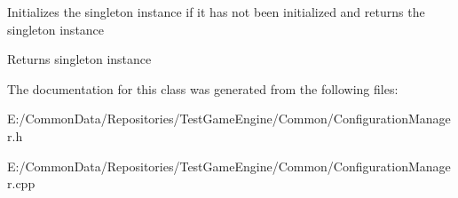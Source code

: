 Initializes the singleton instance if it has not been initialized and returns the singleton instance \begin{DoxyReturn}{Returns}
singleton instance 
\end{DoxyReturn}


The documentation for this class was generated from the following files\+:\begin{DoxyCompactItemize}
\item 
E\+:/\+Common\+Data/\+Repositories/\+Test\+Game\+Engine/\+Common/Configuration\+Manager.\+h\item 
E\+:/\+Common\+Data/\+Repositories/\+Test\+Game\+Engine/\+Common/Configuration\+Manager.\+cpp\end{DoxyCompactItemize}
